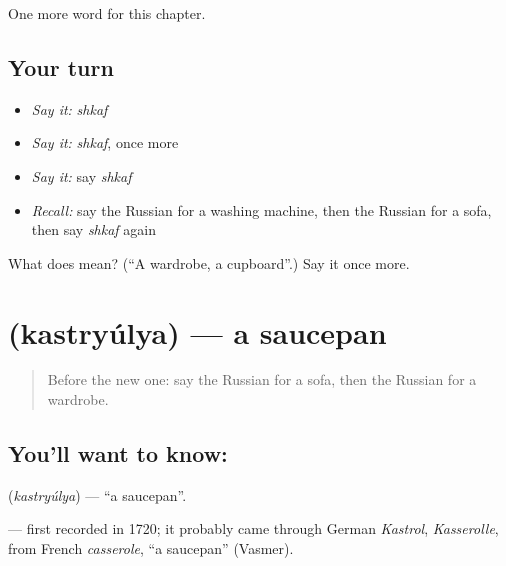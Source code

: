 \begin{grammarlens}[title={What you've built}]
One more word for this chapter.
\end{grammarlens}

\subsection*{Your turn}
\begin{itemize}
\raggedright
  \item \emph{Say it:} \emph{shkaf}
  \item \emph{Say it:} \emph{shkaf}, once more
  \item \emph{Say it:} say \emph{shkaf}
  \item \emph{Recall:} say the Russian for a washing machine, then the Russian for a sofa, then say \emph{shkaf} again
\end{itemize}

\begin{tcolorbox}[breakable,colback=teal!4,colframe=teal!35!black,title={Before you move on}]
What does  mean? (\textquotedblleft{}A wardrobe, a cupboard\textquotedblright{}.) Say it once more.
\end{tcolorbox}
\section[\texorpdfstring{\ru{кастрюля} (kastryúlya)}{кастрюля (kastryúlya)}]{ (kastryúlya) — a saucepan}

\label{lesson:RU-C97-saucepan}



\begin{quote}
Before the new one: say the Russian for a sofa, then the Russian for a wardrobe.
\end{quote}

\subsection*{You'll want to know: }
\textbf{} (\emph{kastryúlya}) — \textquotedblleft{}a saucepan\textquotedblright{}.

\begin{cousinweb}
\textbf{} — first recorded in 1720; it probably came through German \emph{Kastrol}, \emph{Kasserolle}, from French \emph{casserole}, \textquotedblleft{}a saucepan\textquotedblright{} (Vasmer).
\end{cousinweb}

